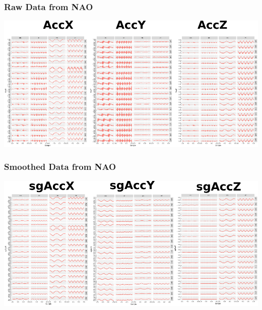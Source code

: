 \documentclass{beamer}
\begin{document}
\begin{frame}
\frametitle{Raw Data from NAO}


\begin{adjustwidth}{-3em}{-3em}
\includegraphics[width=1.2\textwidth]{RS01}
\end{adjustwidth}

\end{frame}



\begin{frame}
\frametitle{Smoothed Data from NAO}


\begin{adjustwidth}{-3em}{-3em}
\includegraphics[width=1.2\textwidth]{RsgS01}
\end{adjustwidth}

\end{frame}
\end{document}
